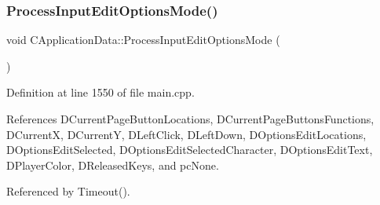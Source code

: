 \hypertarget{classCApplicationData_a345f47a19a5abcc9aeeb6b02b4aaf31b}{}\label{classCApplicationData_a345f47a19a5abcc9aeeb6b02b4aaf31b} 
\subsubsection{\texorpdfstring{Process\+Input\+Edit\+Options\+Mode()}{ProcessInputEditOptionsMode()}}
{\footnotesize\ttfamily void C\+Application\+Data\+::\+Process\+Input\+Edit\+Options\+Mode (\begin{DoxyParamCaption}{ }\end{DoxyParamCaption})\hspace{0.3cm}{\ttfamily [protected]}}



Definition at line 1550 of file main.\+cpp.



References D\+Current\+Page\+Button\+Locations, D\+Current\+Page\+Buttons\+Functions, D\+CurrentX, D\+CurrentY, D\+Left\+Click, D\+Left\+Down, D\+Options\+Edit\+Locations, D\+Options\+Edit\+Selected, D\+Options\+Edit\+Selected\+Character, D\+Options\+Edit\+Text, D\+Player\+Color, D\+Released\+Keys, and pc\+None.



Referenced by Timeout().


